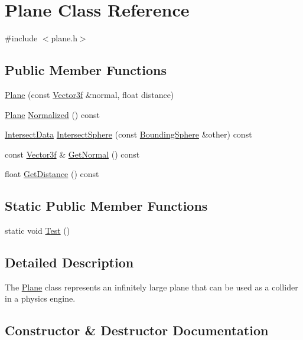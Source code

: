 \hypertarget{class_plane}{}\section{Plane Class Reference}
\label{class_plane}


{\ttfamily \#include $<$plane.\+h$>$}

\subsection*{Public Member Functions}
\begin{DoxyCompactItemize}
\item 
\hyperlink{class_plane_a51ccb4a1b7d2934a30fc50f96559d2fd}{Plane} (const \hyperlink{class_vector3f}{Vector3f} \&normal, float distance)
\item 
\hyperlink{class_plane}{Plane} \hyperlink{class_plane_a55f5df21e132b0abe1e0884142955404}{Normalized} () const 
\item 
\hyperlink{class_intersect_data}{Intersect\+Data} \hyperlink{class_plane_a39d79adca4637fe29b00fcb82571515d}{Intersect\+Sphere} (const \hyperlink{class_bounding_sphere}{Bounding\+Sphere} \&other) const 
\item 
const \hyperlink{class_vector3f}{Vector3f} \& \hyperlink{class_plane_aa3238680f7e7afa2d39270797d9398b4}{Get\+Normal} () const 
\item 
float \hyperlink{class_plane_a180076c8616efa9ea205ac17a6c5bebf}{Get\+Distance} () const 
\end{DoxyCompactItemize}
\subsection*{Static Public Member Functions}
\begin{DoxyCompactItemize}
\item 
static void \hyperlink{class_plane_a5ae751326c9dbeae32d783664801f640}{Test} ()
\end{DoxyCompactItemize}


\subsection{Detailed Description}
The \hyperlink{class_plane}{Plane} class represents an infinitely large plane that can be used as a collider in a physics engine. 

\subsection{Constructor \& Destructor Documentation}
\hypertarget{class_plane_a51ccb4a1b7d2934a30fc50f96559d2fd}{}
